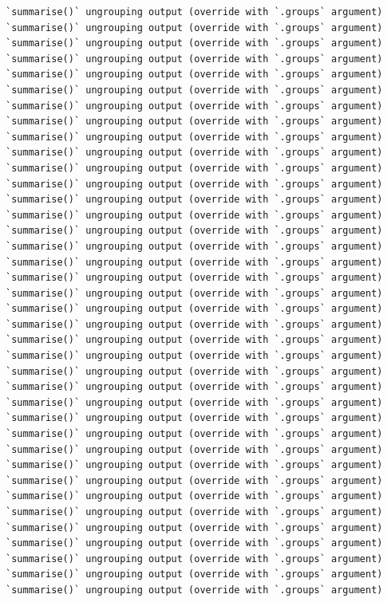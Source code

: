 \documentclass[
]{book}
\begin{document}
\begin{verbatim}
`summarise()` ungrouping output (override with `.groups` argument)
`summarise()` ungrouping output (override with `.groups` argument)
`summarise()` ungrouping output (override with `.groups` argument)
`summarise()` ungrouping output (override with `.groups` argument)
`summarise()` ungrouping output (override with `.groups` argument)
`summarise()` ungrouping output (override with `.groups` argument)
`summarise()` ungrouping output (override with `.groups` argument)
`summarise()` ungrouping output (override with `.groups` argument)
`summarise()` ungrouping output (override with `.groups` argument)
`summarise()` ungrouping output (override with `.groups` argument)
`summarise()` ungrouping output (override with `.groups` argument)
`summarise()` ungrouping output (override with `.groups` argument)
`summarise()` ungrouping output (override with `.groups` argument)
`summarise()` ungrouping output (override with `.groups` argument)
`summarise()` ungrouping output (override with `.groups` argument)
`summarise()` ungrouping output (override with `.groups` argument)
`summarise()` ungrouping output (override with `.groups` argument)
`summarise()` ungrouping output (override with `.groups` argument)
`summarise()` ungrouping output (override with `.groups` argument)
`summarise()` ungrouping output (override with `.groups` argument)
`summarise()` ungrouping output (override with `.groups` argument)
`summarise()` ungrouping output (override with `.groups` argument)
`summarise()` ungrouping output (override with `.groups` argument)
`summarise()` ungrouping output (override with `.groups` argument)
`summarise()` ungrouping output (override with `.groups` argument)
`summarise()` ungrouping output (override with `.groups` argument)
`summarise()` ungrouping output (override with `.groups` argument)
`summarise()` ungrouping output (override with `.groups` argument)
`summarise()` ungrouping output (override with `.groups` argument)
`summarise()` ungrouping output (override with `.groups` argument)
`summarise()` ungrouping output (override with `.groups` argument)
`summarise()` ungrouping output (override with `.groups` argument)
`summarise()` ungrouping output (override with `.groups` argument)
`summarise()` ungrouping output (override with `.groups` argument)
`summarise()` ungrouping output (override with `.groups` argument)
`summarise()` ungrouping output (override with `.groups` argument)
`summarise()` ungrouping output (override with `.groups` argument)
`summarise()` ungrouping output (override with `.groups` argument)

\end{verbatim}
\end{document}
